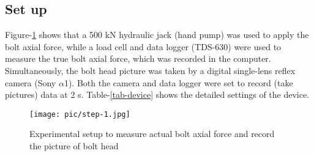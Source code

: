 \documentclass{proc-a4}
\begin{document}
\subsection{Set up}

Figure-\ref{fig-setup} shows that a 500 kN hydraulic jack (hand pump) was used to apply the bolt axial force, while a load cell and data logger (TDS-630) were used to measure the true bolt axial force, which was recorded in the computer. Simultaneously, the bolt head picture was taken by a digital single-lens reflex camera (Sony $\alpha$1). Both the camera and data logger were set to record (take pictures) data at 2 s. Table-\ref{tab-device} shows the detailed settings of the device.

\begin{table}[htbp]

\end{table}

\begin{figure}
    \centering
    \texttt{[image: pic/step-1.jpg]}
    \caption{Experimental setup to measure actual bolt axial force and record the picture of bolt head}
    \label{fig-setup}
\end{figure}
\end{document}
